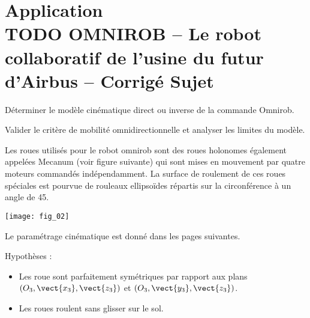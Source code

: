 \chapter*{Application  \\ 
TODO OMNIROB -- Le robot collaboratif de l'usine du futur d'Airbus -- \ifprof Corrigé \else Sujet \fi}

\iflivret {} \else
\ifprof  {} \else \fi
\fi

\setcounter{question}{0}

\marginnote[1cm]{
}


\begin{obj}
Déterminer le modèle cinématique direct ou inverse de la commande Omnirob. 

Valider le critère de mobilité omnidirectionnelle et analyser les limites du modèle.
\end{obj}


Les roues utilisés pour le robot omnirob sont des roues holonomes  également appelées Mecanum (voir figure suivante) qui sont mises en mouvement par quatre moteurs commandés indépendamment. La surface de roulement de ces roues spéciales est pourvue de rouleaux ellipsoïdes répartis sur la circonférence à un angle de 45\degres. 



\begin{marginfigure}
\texttt{[image: fig\_02]}
\end{marginfigure}


Le paramétrage cinématique est donné dans les pages suivantes. 

\ifprof%
\begin{corrige}
\end{corrige}\else\fi

Hypothèses : 
\begin{itemize}
\item Les roue sont parfaitement symétriques par rapport aux plans $\left(O_3,\vect{x_3},\vect{z_3}\right)$
et $\left(O_3,\vect{y_3},\vect{z_3}\right)$.
\item Les roues roulent sans glisser sur le sol.
\end{itemize}

